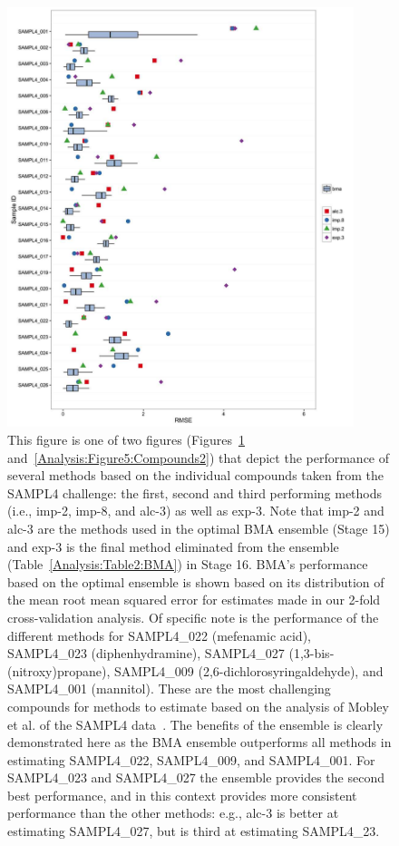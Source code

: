 \documentclass[12pt]{article}
\newcommand{\+}[1]{\ensuremath{\mathbf{#1}}}
\begin{document}
\begin{figure}
	\centering
	\includegraphics[keepaspectratio,width=0.9\textwidth]{Figures/compounds_1}
	\caption{This figure is one of two figures (Figures~\ref{Analysis:Figure4:Compounds1} and~\ref{Analysis:Figure5:Compounds2}) that depict the performance of several methods based on the individual compounds taken from the SAMPL4 challenge: the first, second and third performing methods (i.e., imp-2, imp-8, and alc-3) as well as exp-3. Note that imp-2 and alc-3 are the methods used in the optimal BMA ensemble (Stage 15) and exp-3 is the final method eliminated from the ensemble (Table~\ref{Analysis:Table2:BMA}) in Stage 16. BMA's performance based on the optimal ensemble is shown based on its distribution of the mean root mean squared error for estimates made in our 2-fold cross-validation analysis. Of specific note is the performance of the different methods for SAMPL4\_022 (mefenamic acid), SAMPL4\_023 (diphenhydramine), SAMPL4\_027 (1,3-bis-(nitroxy)propane), SAMPL4\_009 (2,6-dichlorosyringaldehyde), and SAMPL4\_001 (mannitol). These are the most challenging compounds for methods to estimate based on the analysis of Mobley et al. of the SAMPL4 data~\cite{Mobley:2014}. The benefits of the ensemble is clearly demonstrated here as the BMA ensemble outperforms all methods in estimating SAMPL4\_022, SAMPL4\_009, and SAMPL4\_001. For SAMPL4\_023 and SAMPL4\_027 the ensemble provides the second best performance, and in this context provides more consistent performance than the other methods: e.g., alc-3 is better at estimating SAMPL4\_027, but is third at estimating SAMPL4\_23.}
\label{Analysis:Figure4:Compounds1}
\end{figure}
\end{document}
